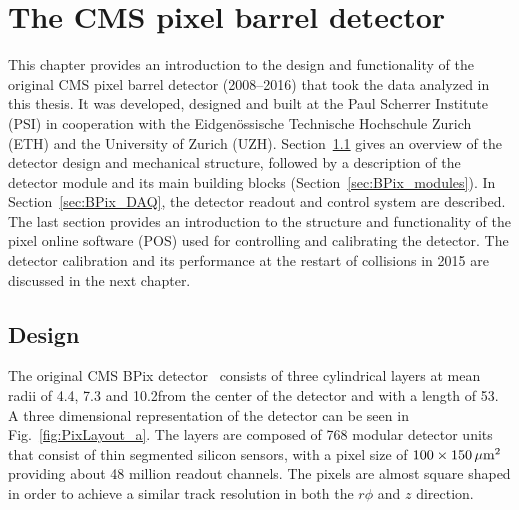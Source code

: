 \chapter{The CMS pixel barrel detector}
\label{ch:BPix}

This chapter provides an introduction to the design and functionality of the original CMS pixel barrel detector (2008--2016) that took the data analyzed in this thesis.
It was developed, designed and built at the Paul Scherrer Institute (PSI) in cooperation with the Eidgen{\"o}ssische Technische Hochschule Zurich (ETH) and the University of Zurich (UZH).
Section~\ref{sec:BPix_design} gives an overview of the detector design and mechanical structure, followed by a description of the detector module and its main building blocks (Section~\ref{sec:BPix_modules}).
In Section~\ref{sec:BPix_DAQ}, the detector readout and control system are described.
The last section provides an introduction to the structure and functionality of the pixel online software (POS) used for controlling and calibrating the detector.
The detector calibration and its performance at the restart of collisions in 2015 are discussed in the next chapter.

\section{Design}\label{sec:BPix_design}

The original CMS BPix detector~\cite{Kastli2007724} consists of three cylindrical layers at mean radii of 4.4, 7.3 and 10.2\cm from the center of the detector and with a length of 53\cm.
A three dimensional representation of the detector can be seen in Fig.~\ref{fig:PixLayout_a}.
The layers are composed of 768 modular detector units that consist of thin segmented silicon sensors, with a pixel size of $100\times150\,\mu\text{m}^2$ providing about 48 million readout channels.
The pixels are almost square shaped in order to achieve a similar track resolution in both the $r\phi$ and $z$ direction.

